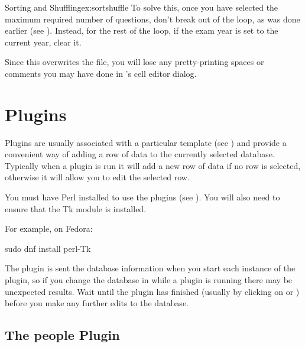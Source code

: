 \begin{example}{Sorting and Shuffling}{ex:sortshuffle}
To solve this, once you have selected the maximum required number of
questions, don't break out of the loop, as was done earlier (see
). Instead, for the rest of the loop, if the exam
year is set to the current year, clear it.


\begin{information}
Since this overwrites the  file, you will
lose any pretty-printing spaces or comments you may have done in 
's cell editor dialog.
\end{information}

\end{example}

\section{Plugins}\label{sec:plugins}

   Plugins are usually associated with a particular template 
   (see ) and provide a convenient way of
   adding a row of data to the currently selected database.
   Typically when a plugin is run it will add a new row of data 
   if no row is selected, otherwise it will allow you to edit the selected row.

   \begin{important}
   You must have Perl installed to use the plugins (see 
   ). You will also need to ensure that
   the Tk module is installed.
   \end{important}

   For example, on Fedora:
\begin{terminal}
sudo dnf install perl-Tk
\end{terminal}

   \begin{warning}
   The plugin is sent the database information when you start each instance of 
   the plugin, so if you change the database in  while 
   a plugin is running there may be unexpected results. 
   Wait until the plugin has finished 
   (usually by clicking on  or 
   ) before you make any further edits to the database.
   \end{warning}


\subsection{The people Plugin}\label{sec:peopleplugin}

